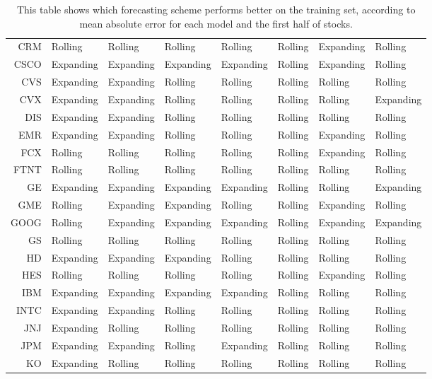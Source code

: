 \begin{table}[ht]
\begin{tabular}{rlllllll}
  CRM & Rolling & Rolling & Rolling & Rolling & Rolling & Expanding & Rolling \\ 
  CSCO & Expanding & Expanding & Expanding & Expanding & Rolling & Expanding & Rolling \\ 
  CVS & Expanding & Expanding & Rolling & Rolling & Rolling & Rolling & Rolling \\ 
  CVX & Expanding & Expanding & Rolling & Rolling & Rolling & Rolling & Expanding \\ 
  DIS & Expanding & Expanding & Rolling & Rolling & Rolling & Rolling & Rolling \\ 
  EMR & Expanding & Expanding & Rolling & Rolling & Rolling & Expanding & Rolling \\ 
  FCX & Rolling & Rolling & Rolling & Rolling & Rolling & Expanding & Rolling \\ 
  FTNT & Rolling & Rolling & Rolling & Rolling & Rolling & Rolling & Rolling \\ 
  GE & Expanding & Expanding & Expanding & Expanding & Rolling & Rolling & Expanding \\ 
  GME & Rolling & Expanding & Expanding & Rolling & Rolling & Expanding & Rolling \\ 
  GOOG & Rolling & Expanding & Expanding & Expanding & Rolling & Expanding & Expanding \\ 
  GS & Rolling & Rolling & Rolling & Rolling & Rolling & Rolling & Rolling \\ 
  HD & Expanding & Expanding & Expanding & Rolling & Rolling & Rolling & Rolling \\ 
  HES & Rolling & Rolling & Rolling & Rolling & Rolling & Expanding & Rolling \\ 
  IBM & Expanding & Expanding & Expanding & Expanding & Rolling & Rolling & Rolling \\ 
  INTC & Expanding & Expanding & Rolling & Rolling & Rolling & Rolling & Rolling \\ 
  JNJ & Expanding & Rolling & Rolling & Rolling & Rolling & Rolling & Rolling \\ 
  JPM & Expanding & Expanding & Rolling & Expanding & Rolling & Rolling & Rolling \\ 
  KO & Expanding & Rolling & Rolling & Rolling & Rolling & Rolling & Rolling \\ 
   \hline
\end{tabular}
\caption[Better scheme MAE (1)]{This table shows which forecasting scheme performs better on the training set, according to mean absolute error 
              for each model and the first half of stocks.} 
\label{Table:Better_MAE_1}
\end{table}
